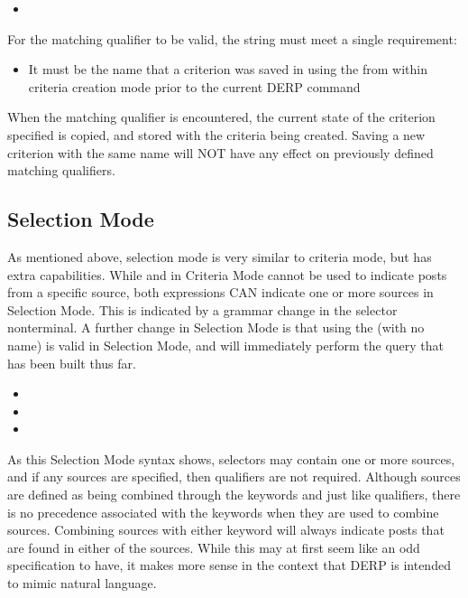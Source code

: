 \begin{itemize}[leftmargin=2in]
    \item[\nonterminal{qualifier}] \bnf{:}  
\end{itemize}

For the matching qualifier to be valid, the string must meet a single requirement:
\begin{itemize}
\item It must be the name that a criterion was saved in using the  from within criteria creation mode prior to the current DERP command
\end{itemize}
When the matching qualifier is encountered, the current state of the criterion specified is copied, and stored with the criteria being created.
Saving a new criterion with the same name will NOT have any effect on previously defined matching qualifiers.

\subsection{Selection Mode}\label{Selection_Mode}
As mentioned above, selection mode is very similar to criteria mode, but has extra capabilities. While  and  in Criteria Mode
cannot be used to indicate posts from a specific source, both expressions CAN indicate one or more sources in Selection Mode. This is indicated by a grammar
change in the selector nonterminal. A further change in Selection Mode is that using the  (with no  name) is valid in Selection Mode, and will immediately perform the query that has been built thus far.

\begin{itemize}[leftmargin=2in]
    \item[\nonterminal{selector}] \bnf{:}  \bnf{|}  
    \item[\nonterminal{source}] \bnf{:}  \bnf{(}  \bnf{|}  \bnf{)}  
    \item[\nonterminal{read\_expression}] \bnf{:}      
\end{itemize}

As this Selection Mode syntax shows, selectors may contain one or more sources, and if any sources are specified, then qualifiers are not required. Although
sources are defined as being combined through the keywords  and  just like qualifiers, there is no precedence associated with the keywords when they
are used to combine sources. Combining sources with either keyword will always indicate posts that are found in either of the sources. While this may at
first seem like an odd specification to have, it makes more sense in the context that DERP is intended to mimic natural language.

